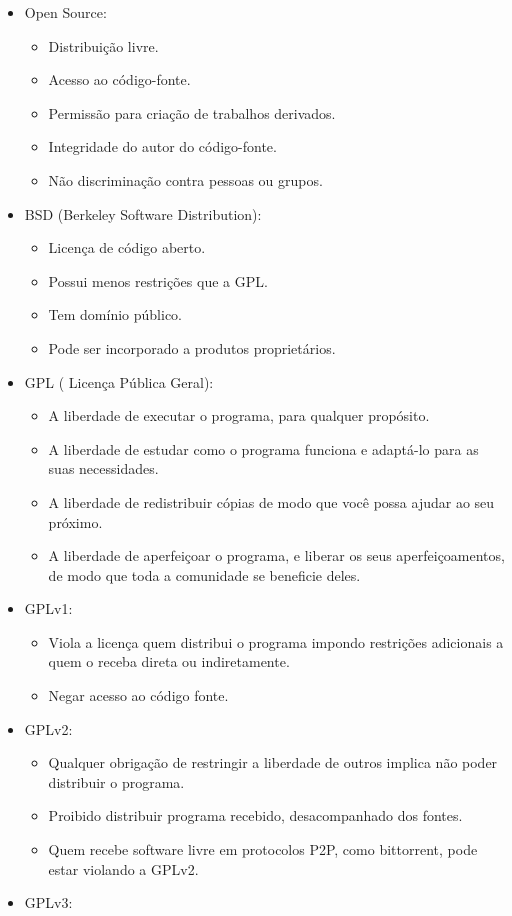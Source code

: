 \documentclass[12pt,a4paper]{article}
\begin{document}
\begin{itemize}

	\item Open Source:
	\begin{itemize}
		\item Distribuição livre.
		\item Acesso ao código-fonte.
		\item Permissão para criação de trabalhos derivados.
		\item Integridade do autor do código-fonte.
		\item Não discriminação contra pessoas ou grupos.
	\end{itemize}
	\item BSD (Berkeley Software Distribution):
	
	\begin{itemize}
		\item Licença de código aberto.
		\item Possui menos restrições que a GPL.
		\item Tem domínio público.
		\item Pode ser incorporado a produtos proprietários.
	\end{itemize}
	\item GPL ( Licença Pública Geral):
	
	\begin{itemize}
		\item A liberdade de executar o programa, para qualquer propósito.
		\item A liberdade de estudar como o programa funciona e adaptá-lo para as suas necessidades.
		\item A liberdade de redistribuir cópias de modo que você possa ajudar ao seu próximo.
		\item A liberdade de aperfeiçoar o programa, e liberar os seus aperfeiçoamentos, de modo que toda a comunidade se beneficie deles.
	\end{itemize}
	\item GPLv1:
	
	\begin{itemize}
		\item Viola a licença quem distribui o programa impondo restrições adicionais a quem o receba direta ou indiretamente.
		\item Negar acesso ao código fonte.
	\end{itemize}
	\item GPLv2:
	
	\begin{itemize}
		\item Qualquer obrigação de restringir a liberdade de outros implica não poder distribuir o programa.
		\item Proibido distribuir programa recebido, desacompanhado dos fontes.
		\item Quem recebe software livre em protocolos P2P, como bittorrent, pode estar violando a GPLv2.
	\end{itemize}
	\item GPLv3:
	

\end{itemize}
\end{document}
